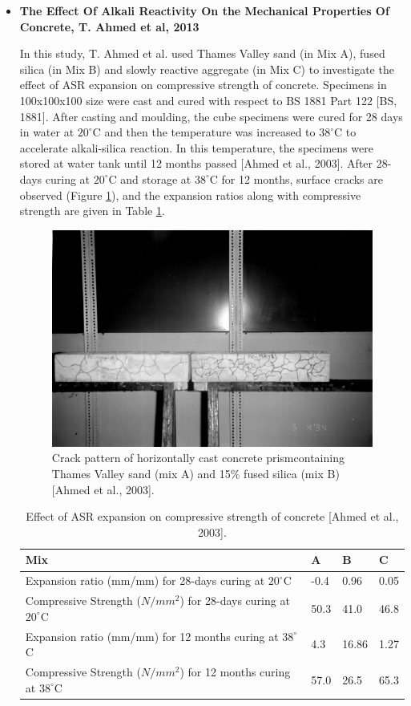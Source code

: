\begin{itemize}
    \item
    \textbf{The Effect Of Alkali Reactivity On the Mechanical Properties Of Concrete, T. Ahmed et al, 2013}

    In this study, T. Ahmed\cite{Ahmed} et al. used Thames Valley sand (in Mix A), fused silica (in Mix B) and slowly reactive aggregate (in Mix C) to investigate the effect of ASR expansion on compressive strength of concrete. Specimens in 100x100x100 size were cast and cured with respect to BS 1881 Part 122 [BS, 1881]. After casting and moulding, the cube specimens were cured for 28 days in water at $20^\circ$C and then the temperature was increased to $38^\circ$C to accelerate alkali-silica reaction. In this temperature, the specimens were stored at water tank until 12 months passed [Ahmed et al., 2003]. After 28-days curing at $20^\circ$C and storage at $38^\circ$C for 12 months, surface cracks are observed (Figure \ref{fig:T.Ahmed_crack}), and the expansion ratios along with compressive strength are given in Table \ref{table:Ahmed et al.}.

    \begin{figure}[ht!]
        \centering
        \includegraphics[width=.6\linewidth]{Files/Background/Ahmed_crack.png}
        \caption{Crack pattern of horizontally cast concrete prismcontaining Thames Valley sand (mix A) and 15\% fused silica (mix B) [Ahmed et al., 2003].}
        \label{fig:T.Ahmed_crack}
    \end{figure}

    \begin{table}[ht!]
        \centering
            \begin{tabular}{ |p{6cm}|p{1.5cm}|p{1.5cm}|p{1.5cm}| }
             \hline
             Mix &  A & B & C  \\ [0.5ex]
             \hline
             Expansion ratio (mm/mm) for 28-days curing at $20^\circ$C & -0.4 & 0.96 & 0.05 \\
             \hline
             Compressive Strength ($N/mm^2$) for 28-days curing at $20^\circ$C & 50.3 & 41.0 & 46.8 \\
             \hline
             Expansion ratio (mm/mm) for 12 months curing at $38^\circ$C & 4.3 & 16.86 & 1.27 \\
             \hline
             Compressive Strength ($N/mm^2$) for 12 months curing at $38^\circ$C & 57.0 & 26.5 & 65.3 \\ [0.5ex]
             \hline
            \end{tabular}
        \caption{Effect of ASR expansion on compressive strength of concrete [Ahmed et al., 2003].}
        \label{table:Ahmed et al.}
    \end{table}



\end{itemize}
